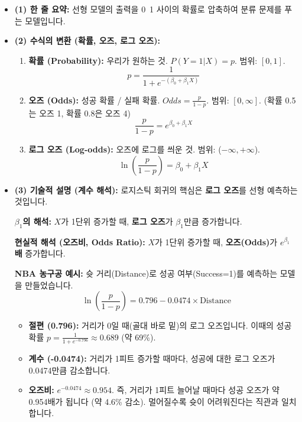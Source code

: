 \documentclass[11pt,a4paper]{book}
\theoremstyle{definition}
\begin{document}
\begin{itemize}
    \item \textbf{(1) 한 줄 요약:} 선형 모델의 출력을 0~1 사이의 확률로 압축하여 분류 문제를 푸는 모델입니다.
    \item \textbf{(2) 수식의 변환 (확률, 오즈, 로그 오즈):}
        \begin{enumerate}
            \item \textbf{확률 (Probability):} 우리가 원하는 것. $P(Y=1 | X) = p$. 범위: $[0, 1]$.
            $$ p = \frac{1}{1 + e^{-(\beta_0 + \beta_1 X)}} $$
            \item \textbf{오즈 (Odds):} 성공 확률 / 실패 확률. $Odds = \frac{p}{1-p}$. 범위: $[0, \infty]$.
            (확률 0.5는 오즈 1, 확률 0.8은 오즈 4)
            $$ \frac{p}{1-p} = e^{\beta_0 + \beta_1 X} $$
            \item \textbf{로그 오즈 (Log-odds):} 오즈에 로그를 씌운 것. 범위: ($-\infty, +\infty$).
            $$ \ln(\frac{p}{1-p}) = \beta_0 + \beta_1 X $$
        \end{enumerate}
    \item \textbf{(3) 기술적 설명 (계수 해석):} 로지스틱 회귀의 핵심은 \textbf{로그 오즈}를 선형 예측하는 것입니다.
    
    \textbf{$\beta_1$의 해석:} $X$가 1단위 증가할 때, \textbf{로그 오즈}가 $\beta_1$만큼 증가합니다.
    
    \textbf{현실적 해석 (오즈비, Odds Ratio):} $X$가 1단위 증가할 때, \textbf{오즈(Odds)}가 $e^{\beta_1}$ \textbf{배} 증가합니다.
    
    \begin{examplebox}
    \textbf{NBA 농구공 예시:} 슛 거리(Distance)로 성공 여부(Success=1)를 예측하는 모델을 만들었습니다.
    $$ \ln(\frac{p}{1-p}) = 0.796 - 0.0474 \times \text{Distance} $$
    \begin{itemize}
        \item \textbf{절편 (0.796):} 거리가 0일 때(골대 바로 밑)의 로그 오즈입니다.
        이때의 성공 확률 $p = \frac{1}{1 + e^{-0.796}} \approx 0.689$ (약 69\%).
        \item \textbf{계수 (-0.0474):} 거리가 1피트 증가할 때마다, 성공에 대한 로그 오즈가 0.0474만큼 감소합니다.
        \item \textbf{오즈비:} $e^{-0.0474} \approx 0.954$. 즉, 거리가 1피트 늘어날 때마다 성공 오즈가 약 0.954배가 됩니다 (약 4.6\% 감소). 멀어질수록 슛이 어려워진다는 직관과 일치합니다.
    \end{itemize}
    \end{examplebox}
\end{itemize}
\end{document}
